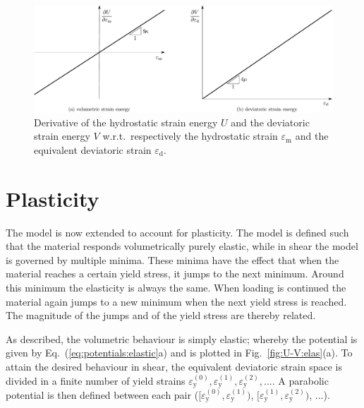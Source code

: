 \documentclass[times,namecite]{goose-article}
\begin{document}
\begin{figure}[htp]
  \centering
  \includegraphics[width=1.\textwidth]{figures/potential_dU-dV_elas}
  \caption{Derivative of the hydrostatic strain energy $U$ and the deviatoric strain energy $V$ w.r.t.\ respectively the hydrostatic strain $\varepsilon_\mathrm{m}$ and the equivalent deviatoric strain $\varepsilon_\mathrm{d}$.}
  \label{fig:dU-dV:elas}
\end{figure}

\section{Plasticity}

The model is now extended to account for plasticity. The model is defined such that the material responds volumetrically purely elastic, while in shear the model is governed by multiple minima. These minima have the effect that when the material reaches a certain yield stress, it jumps to the next minimum. Around this minimum the elasticity is always the same. When loading is continued the material again jumps to a new minimum when the next yield stress is reached. The magnitude of the jumps and of the yield stress are thereby related.

As described, the volumetric behaviour is simply elastic; whereby the potential is given by Eq.~(\ref{eq:potentials:elastic}a) and is plotted in Fig.~\ref{fig:U-V:elas}(a). To attain the desired behaviour in shear, the equivalent deviatoric strain space is divided in a finite number of yield strains $\varepsilon_\mathrm{y}^{(0)}, \varepsilon_\mathrm{y}^{(1)}, \varepsilon_\mathrm{y}^{(2)}, ...$. A parabolic potential is then defined between each pair ($[ \varepsilon_\mathrm{y}^{(0)}, \varepsilon_\mathrm{y}^{(1)} )$, $[ \varepsilon_\mathrm{y}^{(1)}, \varepsilon_\mathrm{y}^{(2)} )$, ...).
\end{document}
